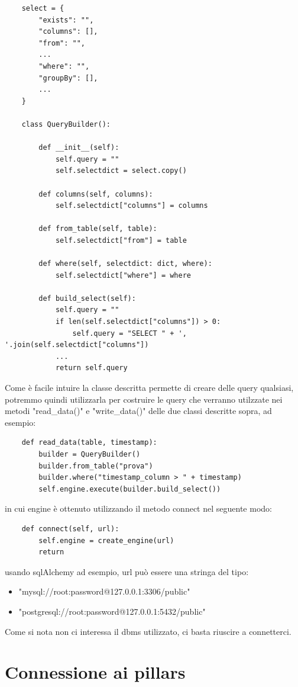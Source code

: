 \documentclass[a4paper]{article}
\begin{document}
\begin{lstlisting}
    select = {
        "exists": "",
        "columns": [],
        "from": "",
        ...
        "where": "",
        "groupBy": [],
        ...
    }
    
    class QueryBuilder():
    
        def __init__(self):
            self.query = ""
            self.selectdict = select.copy()
        
        def columns(self, columns):
            self.selectdict["columns"] = columns
        
        def from_table(self, table):
            self.selectdict["from"] = table
        
        def where(self, selectdict: dict, where):
            self.selectdict["where"] = where
            
        def build_select(self):
            self.query = ""
            if len(self.selectdict["columns"]) > 0:
                self.query = "SELECT " + ', '.join(self.selectdict["columns"])
            ...
            return self.query
\end{lstlisting}
Come è facile intuire la classe descritta permette di creare delle query qualsiasi, potremmo quindi utilizzarla
per costruire le query che verranno utilzzate nei metodi "read\_data()" e "write\_data()" delle due classi descritte sopra,
ad esempio:
\begin{lstlisting}
    def read_data(table, timestamp):
        builder = QueryBuilder()
        builder.from_table("prova")
        builder.where("timestamp_column > " + timestamp)
        self.engine.execute(builder.build_select())
\end{lstlisting}
in cui engine è ottenuto utilizzando il metodo connect nel seguente modo:
\begin{lstlisting}
    def connect(self, url):
        self.engine = create_engine(url)
        return
\end{lstlisting}
usando sqlAlchemy ad esempio, url può essere una stringa del tipo:
\begin{itemize}
    \item "mysql://root:password@127.0.0.1:3306/public"
    \item "postgresql://root:password@127.0.0.1:5432/public"
\end{itemize}
Come si nota non ci interessa il dbms utilizzato, ci basta riuscire a connetterci.

\section{Connessione ai pillars}
\end{document}
